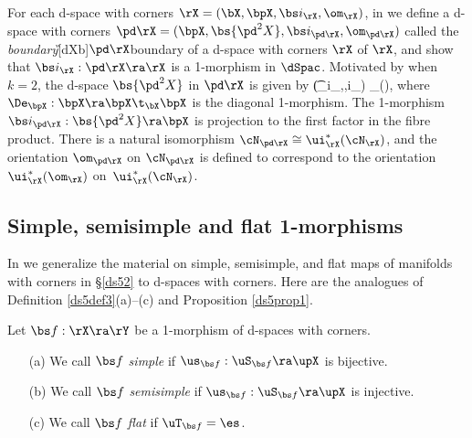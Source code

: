 \documentclass{article}
\begin{document}
For each d-space with corners $\rX=(\bX,\bpX,\bs i_\rX,\om_\rX)$, in
\cite[\S 6.2]{Joyc6} we define a d-space with corners $\pd\rX=(\bpX,
\bs{\pd^2X},\bs i_{\pd\rX},\om_{\pd\rX})$ called the {\it
boundary\/}\G[dXb]{$\pd\rX$}{boundary of a d-space with corners
$\rX$} of $\rX$, and show that $\bs i_\rX:\pd\rX\ra\rX$ is a
1-morphism in $\dSpac$. Motivated by  when $k=2$, the
d-space $\bs{\pd^2X}$ in $\pd\rX$ is given by
\e
{}\simeq \bigl(\bpX\t_{\bs i_\rX,\bX,\bs i_\rX}\bpX\bigr)
\sm\bs\De_\bpX(\bpX),
\label{ds6eq3}
\e
where $\De_\bpX:\bpX\ra\bpX\t_\bX\bpX$ is the diagonal 1-morphism.
The 1-morphism $\bs i_{\pd\rX}:\bs{\pd^2X}\ra\bpX$ is projection to
the first factor in the fibre product. There is a natural
isomorphism $\cN_{\pd\rX}\cong\ui_\rX^*(\cN_\rX)$, and the
orientation $\om_{\pd\rX}$ on $\cN_{\pd\rX}$ is defined to
correspond to the orientation $\ui_\rX^*(\om_\rX)$
on~$\ui_\rX^*(\cN_\rX)$.

\subsection{Simple, semisimple and flat 1-morphisms}
\label{ds62}

In \cite[\S 6.3]{Joyc6} we generalize the material on simple,
semisimple, and flat maps of manifolds with corners in \S\ref{ds52}
to d-spaces with corners. Here are the analogues of Definition
\ref{ds5def3}(a)--(c) and Proposition \ref{ds5prop1}.

\begin{dfn} Let $\bs f:\rX\ra\rY$ be a 1-morphism of d-spaces
with corners.
\begin{itemize}
\setlength{\itemsep}{0pt}
\setlength{\parsep}{0pt}
\item[(a)] We call $\bs f$ {\it simple\/} if $\us_{\bs
f}:\uS_{\bs f}\ra\upX$ is bijective.
\item[(b)] We call $\bs f$ {\it semisimple\/} if $\us_{\bs
f}:\uS_{\bs f}\ra\upX$ is injective.
\item[(c)] We call $\bs f$ {\it flat\/} if $\uT_{\bs f}=\es$.
\end{itemize}
\label{ds6def1}
\end{dfn}
\end{document}
